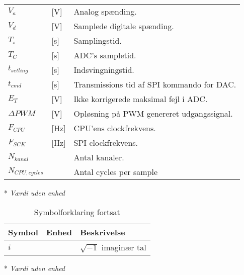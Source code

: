 \begin{table}[h!]
\begin{threeparttable}
\begin{tabular}{l l l}
$V_a$ &[\si{\volt}] & Analog spænding. \\
$V_d$ & [\si{\volt}]& Samplede digitale spænding.\\
$T_s$ & [\si{\second}] & Samplingstid. \\
$T_C$ &[\si{\second}] & ADC's sampletid. \\
$t_{setling}$ &[\si{\second}] & Indsvingningstid. \\
$t_{cmd}$ & [\si{\second}] & Transmissions tid af SPI kommando for DAC.\\
$E_T$ & [\si{\volt}] & Ikke korrigerede maksimal fejl i ADC. \\
$\Delta PWM$ & [\si{\volt}] & Opløsning på PWM genereret udgangssignal. \\
$F_{CPU}$ & [\si{\hertz}] & CPU'ens clockfrekvens. \\
$F_{SCK}$ & [\si{\hertz}] & SPI clockfrekvens.\\
$N_{kanal}$\tnote{*} & & Antal kanaler. \\
$N_{CPU,cycles}$ & & Antal cycles per sample \\
\bottomrule
\end{tabular}
\begin{tablenotes}
\item[*] \textit{Værdi uden enhed}
\end{tablenotes}
\end{threeparttable}
\end{table}




\begin{table}[h!]
\centering
\caption{Symbolforklaring fortsat}
\label{tab:symboler2}
\begin{threeparttable}
\begin{tabular}{l l l}
\toprule
\multicolumn{1}{l}{Symbol}       &
\multicolumn{1}{l}{Enhed}        &
\multicolumn{1}{l}{Beskrivelse}  \\ 
\midrule
$i$\tnote{*}		&								& $\sqrt{-1}$ imaginær tal	\\
\bottomrule
\end{tabular}
\begin{tablenotes}
\item[*] \textit{Værdi uden enhed}
\end{tablenotes}
\end{threeparttable}
\end{table}


